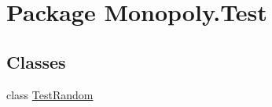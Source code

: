 \hypertarget{namespace_monopoly_1_1_test}{}\section{Package Monopoly.\+Test}
\label{namespace_monopoly_1_1_test}
\subsection*{Classes}
\begin{DoxyCompactItemize}
\item 
class \hyperlink{class_monopoly_1_1_test_1_1_test_random}{Test\+Random}
\end{DoxyCompactItemize}
